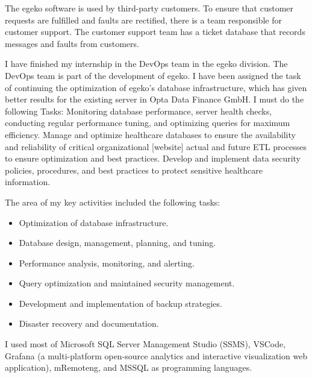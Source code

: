 The egeko software is used by third-party customers. To ensure that customer requests are fulfilled and faults are rectified, there is a team responsible for customer support. The customer support team has a ticket database that records messages and faults from customers.\vspace{.4cm}

I have finished my internship in the DevOps team in the egeko division. The DevOps team is part of the development of egeko. I have been assigned the task of continuing the optimization of egeko's database infrastructure, which has given better results for the existing server in Opta Data Finance GmbH. I must do the following Tasks: Monitoring database performance, server health checks, conducting regular performance tuning, and optimizing queries for maximum efficiency. Manage and optimize healthcare databases to ensure the availability and reliability of critical organizational [website] actual and future ETL processes to ensure optimization and best practices. Develop and implement data security policies, procedures, and best practices to protect sensitive healthcare information.\vspace{.4cm}

The area of my key activities included the following tasks:
\begin{itemize}
    \item Optimization of database infrastructure.
    \item Database design, management, planning, and tuning.
    \item Performance analysis, monitoring, and alerting.
    \item Query optimization and maintained security management.
    \item Development and implementation of backup strategies.
    \item Disaster recovery and documentation.
\end{itemize}
\vspace{.4cm}

I used most of Microsoft SQL Server Management Studio (SSMS), VSCode, Grafana (a multi-platform open-source analytics and interactive visualization web application), mRemoteng, and MSSQL as programming languages.

